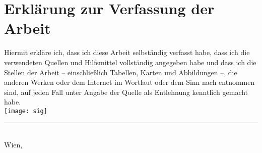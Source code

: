 
\section*{Erkl\"arung zur Verfassung der Arbeit}

\vspace*{3ex}

\noindent
Hiermit erkl\"are ich, dass ich diese Arbeit selbst\"andig verfasst habe, dass ich die verwendeten Quellen und Hilfsmittel vollst\"andig angegeben habe und dass ich die Stellen der Arbeit -- einschließlich Tabellen, Karten und Abbildungen --, die anderen Werken oder dem Internet im Wortlaut oder dem Sinn nach entnommen sind, auf jeden Fall unter Angabe der Quelle als Entlehnung kenntlich gemacht habe.\\[5ex]

\texttt{[image: sig]}

\noindent
\rule{8cm}{.5pt} \\
Wien, \spdate \\
\studname
